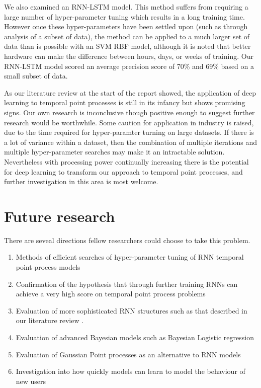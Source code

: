 We also examined an RNN-LSTM model. This method suffers from requiring a large number of hyper-parameter tuning which results in a long training time. However once these hyper-parameters have been settled upon (such as through analysis of a subset of data), the method can be applied to a much larger set of data than is possible with an SVM RBF model, although it is noted that better hardware can make the difference between hours, days, or weeks of training. Our RNN-LSTM model scored an average precision score of 70\% and 69\% based on a small subset of data. 

As our literature review at the start of the report showed, the application of deep learning to temporal point processes is still in its infancy but shows promising signs. Our own research is inconclusive though positive enough to suggest further research would be worthwhile. Some caution for application in industry is raised, due to the time required for hyper-paramter turning on large datasets. If there is a lot of variance within a dataset, then the combination of multiple iterations and multiple hyper-parameter searches may make it an intractable solution. Nevertheless with processing power continually increasing there is the potential for deep learning to transform our approach to temporal point processes, and further investigation in this area is most welcome.

\section{Future research}

There are seveal directions fellow researchers could choose to take this problem.
\begin{enumerate}
	\item Methods of efficient searches of hyper-parameter tuning of RNN temporal point process models
	\item Confirmation of the hypothesis that through further training RNNs can achieve a very high score on temporal point process problems
	\item Evaluation of more sophisticated RNN structures such as that described in our literature review \parencite{xiao2017modeling}.
	\item Evaluation of advanced Bayesian models such as Bayesian Logistic regression
	\item Evaluation of Gaussian Point processes as an alternative to RNN models
	\item Investigation into how quickly models can learn to model the behaviour of new users
\end{enumerate}